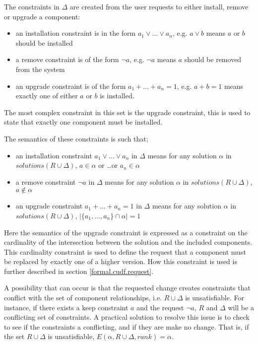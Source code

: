 The constraints in $\Delta$ are created from the user requests to either install, remove or upgrade a component:
\begin{itemize}
  \item an installation constraint is in the form $a_1 \vee \ldots \vee a_n$, e.g. $a \vee b$ means $a$ or $b$ should be installed
  \item a remove constraint is of the form $\neg a$, e.g. $\neg a$ means $a$ should be removed from the system
  \item an upgrade constraint is of the form $a_1 + \ldots + a_n = 1$, e.g. $a + b = 1$ means exactly one of either $a$ or $b$ is installed.   
\end{itemize} 
The most complex constraint in this set is the upgrade constraint, this is used to state that exactly one component must be installed.

The semantics of these constraints is such that;
\begin{itemize}
  \item an installation constraint $a_1 \vee \ldots \vee a_n$ in $\Delta$ means for any solution $\alpha$ in $solutions(R \cup \Delta)$, $a \in \alpha$ or \ldots or $a_n \in \alpha$ 
  \item a remove constraint  $\neg a$ in $\Delta$ means for any solution $\alpha$ in $solutions(R \cup \Delta)$, $a \not \in \alpha$
  \item an upgrade constraint $a_1 + \ldots + a_n = 1$ in $\Delta$ means for any solution $\alpha$ in $solutions(R \cup \Delta)$, $|\{a_1,\ldots,a_n\} \cap \alpha| = 1$
\end{itemize} 
Here the semantics of the upgrade constraint is expressed as a constraint on the cardinality of the intersection between the solution and the included components.
This cardinality constraint is used to define the request that a component must be replaced by exactly one of a higher version.
How this constraint is used is further described in section \ref{formal.cudf.request}. 

A possibility that can occur is that the requested change creates constraints that conflict with the set of component relationships,
i.e. $R \cup \Delta$ is unsatisfiable.
For instance, if there exists a keep constraint $a$ and the request $\neg a$, $R$ and $\Delta$ will be a conflicting set of constraints.   
A practical solution to resolve this issue is to check to see if the constraints a conflicting, and if they are make no change.
That is, if the set $R \cup \Delta$ is unsatisfiable, $E(\alpha, R \cup \Delta,rank) = \alpha$.

